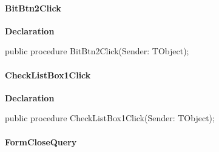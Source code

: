 \documentclass{report}
\newif\ifpdf
\begin{document}
\paragraph*{BitBtn2Click}\hspace*{\fill}

\label{mnupdate.TUMnForm-BitBtn2Click}
\begin{list}{}{
\setlength{\itemindent}{0cm}
\setlength{\listparindent}{0cm}
\setlength{\leftmargin}{\evensidemargin}
\addtolength{\leftmargin}{\tmplength}
\settowidth{\labelsep}{X}
\addtolength{\leftmargin}{\labelsep}
\setlength{\labelwidth}{\tmplength}
}
\item[\textbf{Declaration}\hfill]
\ifpdf
\begin{flushleft}
\fi
\begin{ttfamily}
public procedure BitBtn2Click(Sender: TObject);\end{ttfamily}

\ifpdf
\end{flushleft}
\fi

\end{list}
\paragraph*{CheckListBox1Click}\hspace*{\fill}

\label{mnupdate.TUMnForm-CheckListBox1Click}
\begin{list}{}{
\setlength{\itemindent}{0cm}
\setlength{\listparindent}{0cm}
\setlength{\leftmargin}{\evensidemargin}
\addtolength{\leftmargin}{\tmplength}
\settowidth{\labelsep}{X}
\addtolength{\leftmargin}{\labelsep}
\setlength{\labelwidth}{\tmplength}
}
\item[\textbf{Declaration}\hfill]
\ifpdf
\begin{flushleft}
\fi
\begin{ttfamily}
public procedure CheckListBox1Click(Sender: TObject);\end{ttfamily}

\ifpdf
\end{flushleft}
\fi

\end{list}
\paragraph*{FormCloseQuery}\hspace*{\fill}
\end{document}

